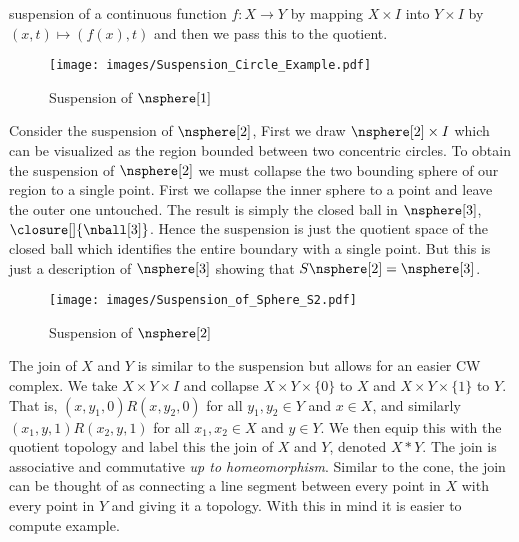         suspension of a continuous function $f:X\rightarrow{Y}$ by
        mapping $X\times{I}$ into $Y\times{I}$ by
        $(x,t)\mapsto(f(x),t)$ and then we pass this to the quotient.
        \begin{figure}[H]
            \centering
            \captionsetup{type=figure}
            \texttt{[image: images/Suspension\_Circle\_Example.pdf]}
            \caption{Suspension of $\nsphere[1]$}
            \label{fig:Suspension_of_Circle}
        \end{figure}
        \begin{example}
            Consider the suspension of $\nsphere[2]$, First we draw
            $\nsphere[2]\times{I}$ which can be visualized as the region
            bounded between two concentric circles. To obtain the
            suspension of $\nsphere[2]$ we must collapse the two
            bounding sphere of our region to a single point. First we
            collapse the inner sphere to a point and leave the outer one
            untouched. The result is simply the closed ball in
            $\nsphere[3]$, $\closure[]{\nball[3]}$. Hence the suspension
            is just the quotient space of the closed ball which
            identifies the entire boundary with a single point. But this
            is just a description of $\nsphere[3]$ showing that
            $S\nsphere[2]=\nsphere[3]$.
        \end{example}
        \begin{figure}[H]
            \centering
            \captionsetup{type=figure}
            \texttt{[image: images/Suspension\_of\_Sphere\_S2.pdf]}
            \caption{Suspension of $\nsphere[2]$}
            \label{fig:Suspension_of_Sphere}
        \end{figure}
        The join of $X$ and $Y$ is similar to the suspension but allows
        for an easier CW complex. We take $X\times{Y}\times{I}$ and
        collapse $X\times{Y}\times\{0\}$ to $X$ and
        $X\times{Y}\times\{1\}$ to $Y$. That is,
        $(x,y_{1},0)R(x,y_{2},0)$ for all $y_{1},y_{2}\in{Y}$ and
        $x\in{X}$, and similarly $(x_{1},y,1)R(x_{2},y,1)$ for all
        $x_{1},x_{2}\in{X}$ and $y\in{Y}$. We then equip this with the
        quotient topology and label this the join of $X$ and $Y$,
        denoted $X*Y$. The join is associative and commutative
        \textit{up to homeomorphism}. Similar to the cone, the join can
        be thought of as connecting a line segment between every point
        in $X$ with every point in $Y$ and giving it a topology. With
        this in mind it is easier to compute example.
